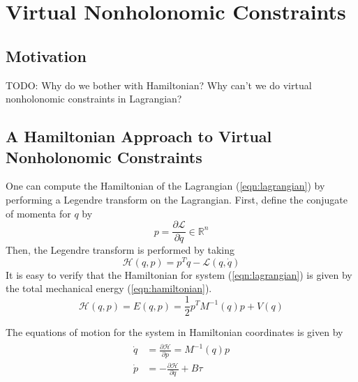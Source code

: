 
\section{Virtual Nonholonomic Constraints}\label{sec:vnhcs}

\subsection{Motivation}
TODO: Why do we bother with Hamiltonian? Why can't we do virtual nonholonomic constraints in Lagrangian?

\subsection{A Hamiltonian Approach to Virtual Nonholonomic Constraints}
One can compute the Hamiltonian of the Lagrangian (\ref{eqn:lagrangian}) by 
performing a Legendre transform on the Lagrangian. 
First, define the conjugate of momenta for \(q\) by 
\[
p = \frac{\partial \mathcal{L}}{\partial \dot{q}} \in \mathbb{R}^n
\]
Then, the Legendre transform is performed by taking
\[
\mathcal{H}(q,p) = p^T \dot{q} - \mathcal{L}(q,\dot{q})
\]
It is easy to verify that the Hamiltonian for system (\ref{eqn:lagrangian}) is 
given by the total mechanical energy (\ref{eqn:hamiltonian}).
\begin{equation}\label{eqn:hamiltonian}
\mathcal{H}(q,p) = E(q,p) = \frac{1}{2} p^T M^{-1}(q) p + V(q)
\end{equation}

The equations of motion for the system in Hamiltonian coordinates is given by
\begin{align}\label{eqn:hamiltionian_eom}
\begin{split}
\dot{q} &= \frac{\partial \mathcal{H}}{\partial p} = M^{-1}(q) p \\
\dot{p} &= -\frac{\partial \mathcal{H}}{\partial q} + B \tau
\end{split}
\end{align}

